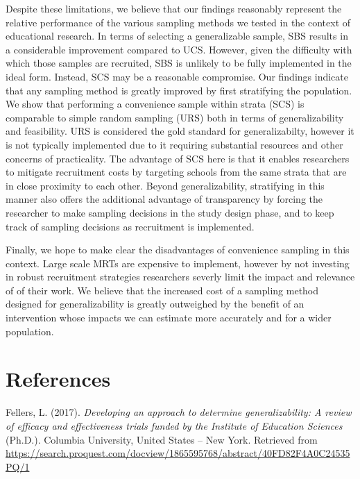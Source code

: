 \documentclass[man,floatsintext]{apa6}
\begin{document}
Despite these limitations, we believe that our findings reasonably represent the relative performance of the various sampling methods we tested in the context of educational research. In terms of selecting a generalizable sample, SBS results in a considerable improvement compared to UCS. However, given the difficulty with which those samples are recruited, SBS is unlikely to be fully implemented in the ideal form. Instead, SCS may be a reasonable compromise. Our findings indicate that any sampling method is greatly improved by first stratifying the population. We show that performing a convenience sample within strata (SCS) is comparable to simple random sampling (URS) both in terms of generalizability and feasibility. URS is considered the gold standard for generalizabilty, however it is not typically implemented due to it requiring substantial resources and other concerns of practicality. The advantage of SCS here is that it enables researchers to mitigate recruitment costs by targeting schools from the same strata that are in close proximity to each other. Beyond generalizability, stratifying in this manner also offers the additional advantage of transparency by forcing the researcher to make sampling decisions in the study design phase, and to keep track of sampling decisions as recruitment is implemented.

Finally, we hope to make clear the disadvantages of convenience sampling in this context. Large scale MRTs are expensive to implement, however by not investing in robust recruitment strategies researchers severly limit the impact and relevance of of their work. We believe that the increased cost of a sampling method designed for generalizability is greatly outweighed by the benefit of an intervention whose impacts we can estimate more accurately and for a wider population.

\hypertarget{references}{%
\section{References}\label{references}}

\begingroup
\setlength{\parindent}{-0.5in}
\setlength{\leftskip}{0.5in}

\hypertarget{refs}{}
\leavevmode\hypertarget{ref-fellersDevelopingApproachDetermine2017}{}%
Fellers, L. (2017). \emph{Developing an approach to determine generalizability: A review of efficacy and effectiveness trials funded by the Institute of Education Sciences} (Ph.D.). Columbia University, United States -- New York. Retrieved from \url{https://search.proquest.com/docview/1865595768/abstract/40FD82F4A0C24535PQ/1}
\end{document}
